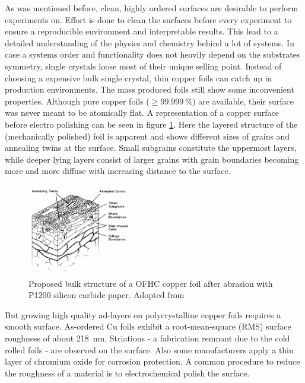 As was mentioned before, clean, highly ordered surfaces are desirable to perform experiments on. Effort is done to clean the surfaces before every experiment to ensure a reproducible environment and interpretable results. This lead to a detailed understanding of the physics and chemistry behind a lot of systems. In case a systems order and functionality does not heavily depend on the substrates symmetry, single crystals loose most of their unique selling point. Instead of choosing a expensive bulk single crystal, thin copper foils can catch up in production environments. The mass produced foils still show some inconvenient properties. Although pure copper foils ($\geq \SI{99.999}{\percent}$) are available, their surface was never meant to be atomically flat. 
A representation of a copper surface before electro polishing can be seen in figure \ref{fig:copper-foil-grains}. Here the layered structure of the (mechanically polished) foil is apparent and shows different sizes of grains and annealing twins at the surface. Small subgrains constitute the uppermost layers, while deeper lying layers consist of larger grains with grain boundaries becoming more and more diffuse with increasing distance to the surface.

%	


\begin{figure}
	\includegraphics[height=40mm]{./images/grain-structure-copper-foil}
	\caption{Proposed bulk structure of a OFHC copper foil after abrasion with P1200 silicon carbide paper. Adopted from \cite{turley_nature_1981}}
	\label{fig:copper-foil-grains}
\end{figure}

But growing high quality ad-layers on polycrystalline copper foils requires a smooth surface. As-ordered Cu foils exhibit a root-mean-square (RMS) surface roughness of about \SI{218}{\nm}\cite{bin_zhang_low-temperature_2012}. Striations - a fabrication remnant due to the cold rolled foils - are observed on the surface\cite{kim_synthesis_2012-1}. Also some manufacturers apply a thin layer of chromium oxide for corrosion protection\cite{bin_zhang_low-temperature_2012}. A common procedure to reduce the roughness of a material is to electrochemical polish the surface.

